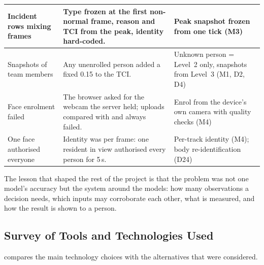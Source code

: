 \begin{table}[htbp]
\begin{tabularx}{\textwidth}{|L{3.0cm}|Y|L{3.4cm}|}
Incident rows mixing frames & Type frozen at the first non-normal frame, reason and TCI from the peak, identity hard-coded. & Peak snapshot frozen from one tick (M3)\\ \hline
Snapshots of team members & Any unenrolled person added a fixed 0.15 to the TCI. & Unknown person = Level~2 only, snapshots from Level~3 (M1, D2, D4)\\ \hline
Face enrolment failed & The browser asked for the webcam the server held; uploads compared  with  and always failed. & Enrol from the device's own camera with quality checks (M4)\\ \hline
One face authorised everyone & Identity was per frame: one resident in view authorised every person for 5\,s. & Per-track identity (M4); body re-identification (D24)\\ \hline
\end{tabularx}
\end{table}

The lesson that shaped the rest of the project is that the problem was not one model's accuracy but the system around the models: how many observations a decision needs, which inputs may corroborate each other, what is measured, and how the result is shown to a person.

\subsection{Survey of Tools and Technologies Used}
\label{sec:tools-survey}
 compares the main technology choices with the alternatives that were considered.

